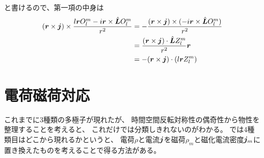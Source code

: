 \documentclass[../../master.tex]{subfiles}
\begin{document}
と書けるので、第一項の中身は
\begin{equation}\begin{aligned}[b]
    (\vb*{r}\times\vb*{j})\times\frac{l\vb*{r}O_l^m-i\vb*{r}\times \hat{\vb*{L}}O_l^m}{r^2}
    &=-\frac{(\vb*{r}\times\vb*{j})\times(-i\vb*{r}\times\hat{\vb*{L}}O_l^m)}{r^2}\\
    &= \frac{(\vb*{r}\times\vb*{j})\cdot\hat{\vb*{L}}Z_l^m}{r^2}\vb*{r}\\
    &=-(\vb*{r}\times \vb*{j})\cdot(l\vb*{r}Z_l^m)
\end{aligned}\end{equation}


\clearpage
\section{電荷磁荷対応}
これまでに3種類の多極子が現れたが、
時間空間反転対称性の偶奇性から物性を整理することを考えると、
これだけでは分類しきれないのがわかる。
では4種類目はどこから現れるかというと、
電荷\(\rho\)と電流\(\vb*{j}\)を磁荷\(\rho_m\)と磁化電流密度\(\vb*{j}_m\)に置き換えたものを考えることで得る方法がある。
\end{document}
